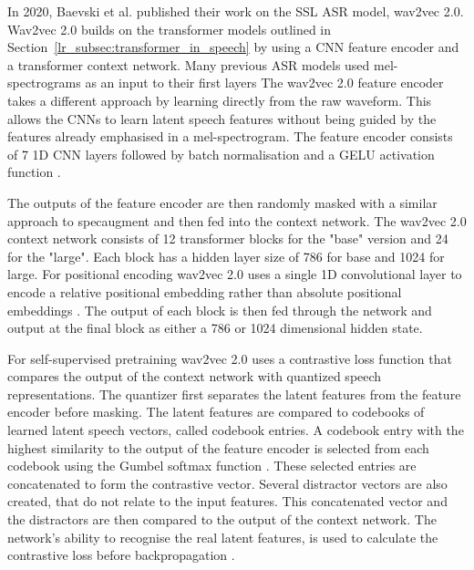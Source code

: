 In 2020, Baevski et al. \cite{wav2vec} published their work on the SSL ASR model, wav2vec 2.0. Wav2vec 2.0 builds on the transformer models outlined in Section~\ref{lr_subsec:transformer_in_speech} by using a CNN feature encoder and a transformer context network. Many previous ASR models used mel-spectrograms as an input to their first layers \cite{amodei2016deep, chorowski2015attention, hannun2014deep} The wav2vec 2.0 feature encoder takes a different approach by learning directly from the raw waveform. This allows the CNNs to learn latent speech features without being guided by the features already emphasised in a mel-spectrogram. The feature encoder consists of 7 1D CNN layers followed by batch normalisation \cite{pmlr-v37-ioffe15} and a GELU activation function \cite{hendrycks2016gaussian}.

The outputs of the feature encoder are then randomly masked with a similar approach to specaugment \cite{park2019specaugment} and then fed into the context network. The wav2vec 2.0 context network consists of 12 transformer blocks \cite{vaswani2017attention} for the "base" version and 24 for the "large"\cite{wav2vec}. Each block has a hidden layer size of 786 for base and 1024 for large. For positional encoding wav2vec 2.0 uses a single 1D convolutional layer \cite{lecuncnn1998} to encode a relative positional embedding rather than absolute positional embeddings \cite{vaswani2017attention}. The output of each block is then fed through the network and output at the final block as either a 786 or 1024 dimensional hidden state.

For self-supervised pretraining wav2vec 2.0 uses a contrastive loss function that compares the output of the context network with quantized speech representations. The quantizer first separates the latent features from the feature encoder before masking. The latent features are compared to codebooks of learned latent speech vectors, called codebook entries. A codebook entry with the highest similarity to the output of the feature encoder is selected from each codebook using the Gumbel softmax function \cite{jang2017categorical}. These selected entries are concatenated to form the contrastive vector. Several distractor vectors are also created, that do not relate to the input features. This concatenated vector and the distractors are then compared to the output of the context network. The network's ability to recognise the real latent features, is used to calculate the contrastive loss before backpropagation \cite{rumelhart1986learning}.

